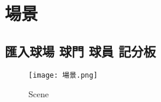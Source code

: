 \chapter{場景}
\section{匯入球場 球門 球員 記分板}
\begin{figure}[hbt!]
  \begin{center}
    \texttt{[image: 場景.png]}
  \end{center}
  \caption{Scene}
  \label{fig:photo}
\end{figure}
